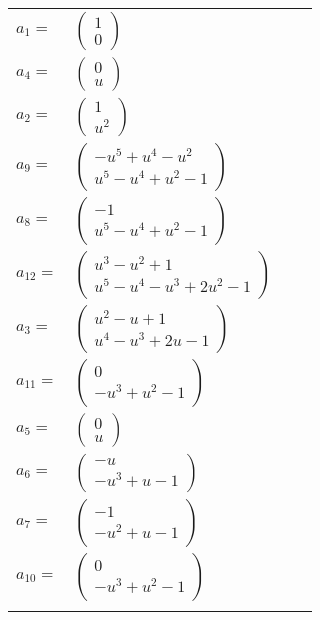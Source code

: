 \documentclass[1p]{elsarticle_modified}
\theoremstyle{definition}
\begin{document}
\begin{tabular}{m{7pt} m{180pt} m{7pt} m{180pt} }
\flushright $a_{1}=$&$\begin{pmatrix}1\\0\end{pmatrix}$ \\
\flushright $a_{4}=$&$\begin{pmatrix}0\\u\end{pmatrix}$ \\
\flushright $a_{2}=$&$\begin{pmatrix}1\\u^2\end{pmatrix}$ \\
\flushright $a_{9}=$&$\begin{pmatrix}- u^5+u^4- u^2\\u^5- u^4+u^2-1\end{pmatrix}$ \\
\flushright $a_{8}=$&$\begin{pmatrix}-1\\u^5- u^4+u^2-1\end{pmatrix}$ \\
\flushright $a_{12}=$&$\begin{pmatrix}u^3- u^2+1\\u^5- u^4- u^3+2 u^2-1\end{pmatrix}$ \\
\flushright $a_{3}=$&$\begin{pmatrix}u^2- u+1\\u^4- u^3+2 u-1\end{pmatrix}$ \\
\flushright $a_{11}=$&$\begin{pmatrix}0\\- u^3+u^2-1\end{pmatrix}$ \\
\flushright $a_{5}=$&$\begin{pmatrix}0\\u\end{pmatrix}$ \\
\flushright $a_{6}=$&$\begin{pmatrix}- u\\- u^3+u-1\end{pmatrix}$ \\
\flushright $a_{7}=$&$\begin{pmatrix}-1\\- u^2+u-1\end{pmatrix}$ \\
\flushright $a_{10}=$&$\begin{pmatrix}0\\- u^3+u^2-1\end{pmatrix}$\\&\end{tabular}
\end{document}
